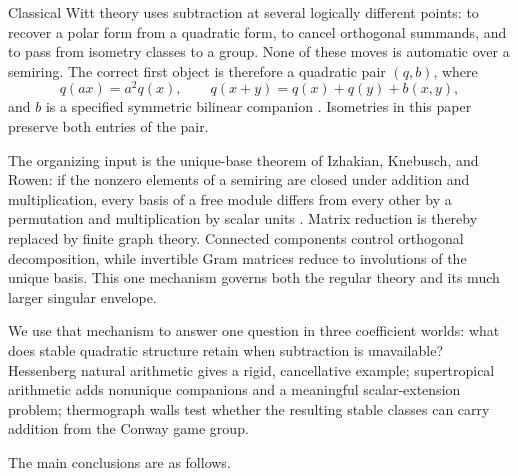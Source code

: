 \documentclass[11pt]{article}
\theoremstyle{definition}
\theoremstyle{remark}
\begin{document}
Classical Witt theory uses subtraction at several logically different points:
to recover a polar form from a quadratic form, to cancel orthogonal summands,
and to pass from isometry classes to a group.  None of these moves is automatic
over a semiring.  The correct first object is therefore a quadratic pair
\((q,b)\),
where
\[
 q(ax)=a^2q(x),\qquad
 q(x+y)=q(x)+q(y)+b(x,y),
\]
and \(b\) is a specified symmetric bilinear companion
\cite{ikr2016qf1}.  Isometries in this paper preserve both entries of the
pair.

The organizing input is the unique-base theorem of Izhakian, Knebusch, and
Rowen: if the nonzero elements of a semiring are closed under addition and
multiplication, every basis of a free module differs from every other by a
permutation and multiplication by scalar units
\cite[Theorem~1.3]{ikr2016uniquebase}.  Matrix reduction is thereby replaced
by finite graph theory.  Connected components control orthogonal
decomposition, while invertible Gram matrices reduce to involutions of the
unique basis.  This one mechanism governs both the regular theory and its much
larger singular envelope.

We use that mechanism to answer one question in three coefficient worlds:
what does stable quadratic structure retain when subtraction is unavailable?
Hessenberg natural arithmetic gives a rigid, cancellative example;
supertropical arithmetic adds nonunique companions and a meaningful
scalar-extension problem; thermograph walls test whether the resulting stable
classes can carry addition from the Conway game group.

The main conclusions are as follows.
\end{document}
